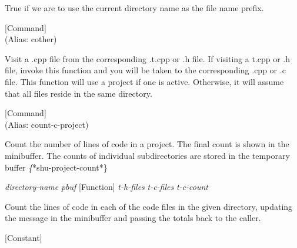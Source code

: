 \begin{doc-string}
True if we are to use the current directory name as the file name prefix.
\end{doc-string}

\vspace{1em}
\noindent
{}
\usebox{\funcname}
 \hfill [Command]\\%
 (Alias: cother)

\begin{doc-string}
Visit a .cpp file from the corresponding .t.cpp or .h file.  If visiting a
t.cpp or .h file, invoke this function and you will be taken to the
corresponding .cpp or .c file.  This function will use a project if one is
active.  Otherwise, it will assume that all files reside in the same directory.
\end{doc-string}

\vspace{1em}
\noindent
{}
\usebox{\funcname}
 \hfill [Command]\\%
 (Alias: count-c-project)

\begin{doc-string}
Count the number of lines of code in a project.  The final count is shown in
the minibuffer.  The counts of individual subdirectories are stored in the
temporary buffer \emph\{*shu-project-count*\}
\end{doc-string}

\vspace{1em}
\noindent
{}
\usebox{\funcname}\emph{directory-name} \emph{pbuf}
 \hfill [Function]
\hspace*{\wd\funcname}\emph{t-h-files} \emph{t-c-files}
\hspace*{\wd\funcname}\emph{t-c-count}

\begin{doc-string}
Count the lines of code in each of the code files in the given directory, updating
the message in the minibuffer and passing the totals back to the caller.
\end{doc-string}

\vspace{1em}
\noindent
{}
\usebox{\funcname}
 \hfill [Constant]

